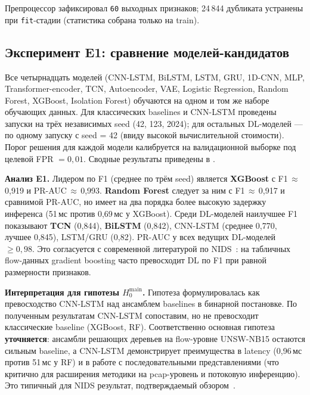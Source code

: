 \documentclass[14pt, a4paper]{extarticle}
\begin{document}
Препроцессор зафиксировал \texttt{60} выходных признаков; 24\,844 дубликата
устранены при \texttt{fit}-стадии (статистика собрана только на train).

\subsection{Эксперимент E1: сравнение моделей-кандидатов}

Все четырнадцать моделей (CNN-LSTM, BiLSTM, LSTM, GRU, 1D-CNN, MLP,
Transformer-encoder, TCN, Autoencoder, VAE, Logistic Regression,
Random Forest, XGBoost, Isolation Forest) обучаются на одном и том же
наборе обучающих данных. Для классических baselines и CNN-LSTM проведены
запуски на трёх независимых seed (42, 123, 2024); для остальных DL-моделей
--- по одному запуску с seed = 42 (ввиду высокой вычислительной стоимости).
Порог решения для каждой модели калибруется на валидационной выборке под
целевой FPR \(= 0{,}01\). Сводные результаты приведены в
.



\textbf{Анализ E1.} Лидером по F1 (среднее по трём seed) является
\textbf{XGBoost} с F1\,$\approx$\,0{,}919 и PR-AUC\,$\approx$\,0{,}993.
\textbf{Random Forest} следует за ним с F1\,$\approx$\,0{,}917 и
сравнимой PR-AUC, но имеет на два порядка более высокую задержку
инференса (51\,мс против 0{,}69\,мс у XGBoost). Среди DL-моделей наилучшее
F1 показывают \textbf{TCN} (0{,}844), \textbf{BiLSTM} (0{,}842), CNN-LSTM
(среднее 0{,}770, лучшее 0{,}845), LSTM/GRU (0{,}82). PR-AUC у всех
ведущих DL-моделей $\geq 0{,}98$. Это согласуется с современной
литературой по NIDS~\cite{vinayakumar2019dl, ferrag2020dlcyber}: на
табличных flow-данных gradient boosting часто превосходит DL по F1
при равной размерности признаков.

\textbf{Интерпретация для гипотезы $H_0^{\text{main}}$.} Гипотеза
формулировалась как превосходство CNN-LSTM над ансамблем baselines в
бинарной постановке. По полученным результатам CNN-LSTM сопоставим, но
не превосходит классические baseline (XGBoost, RF). Соответственно
основная гипотеза \textbf{уточняется}: ансамбли решающих деревьев на
flow-уровне UNSW-NB15 остаются сильным baseline, а CNN-LSTM
демонстрирует преимущества в latency (0{,}96\,мс против 51\,мс у RF) и
в работе с последовательными представлениями (что критично для расширения
методики на pcap-уровень и потоковую инференцию). Это типичный для NIDS
результат, подтверждаемый
обзором~\cite{ferrag2020dlcyber, ahmad2021nids}.
\end{document}
